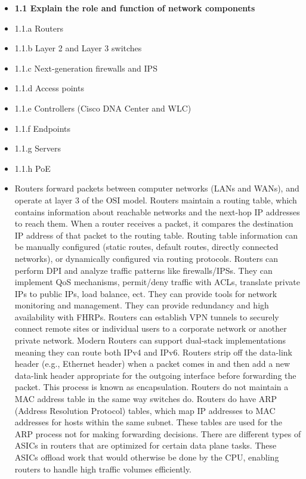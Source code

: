 \documentclass{article}
\begin{document}
\begin{itemize}
  \item \textbf{1.1 Explain the role and function of network components}
  \item 1.1.a Routers
  \item 1.1.b Layer 2 and Layer 3 switches
  \item 1.1.c Next-generation firewalls and IPS
  \item 1.1.d Access points
  \item 1.1.e Controllers (Cisco DNA Center and WLC)
  \item 1.1.f Endpoints
  \item 1.1.g Servers
  \item 1.1.h PoE
  	\item[] Routers forward packets between computer networks (LANs and WANs), and operate at layer 3 of the OSI model. Routers maintain a routing table, which contains information about reachable networks and the next-hop IP addresses to reach them. When a router receives a packet, it compares the destination IP address of that packet to the routing table. Routing table information can be manually configured (static routes, default routes, directly connected networks), or dynamically configured via routing protocols. Routers can perform DPI and analyze traffic patterns like firewalls/IPSs. They can implement QoS mechanisms, permit/deny traffic with ACLs, translate private IPs to public IPs, load balance, ect. They can provide tools for network monitoring and management. They can provide redundancy and high availability with FHRPs. Routers can establish VPN tunnels to securely connect remote sites or individual users to a corporate network or another private network. Modern Routers can support dual-stack implementations meaning they can route both IPv4 and IPv6. Routers strip off the data-link header (e.g., Ethernet header) when a packet comes in and then add a new data-link header appropriate for the outgoing interface before forwarding the packet. This process is known as encapsulation. Routers do not maintain a MAC address table in the same way switches do. Routers do have ARP (Address Resolution Protocol) tables, which map IP addresses to MAC addresses for hosts within the same subnet. These tables are used for the ARP process not for making forwarding decisions. There are different types of ASICs in routers that are optimized for certain data plane tasks. These ASICs offload work that would otherwise be done by the CPU, enabling routers to handle high traffic volumes efficiently.

\end{itemize}
\end{document}

